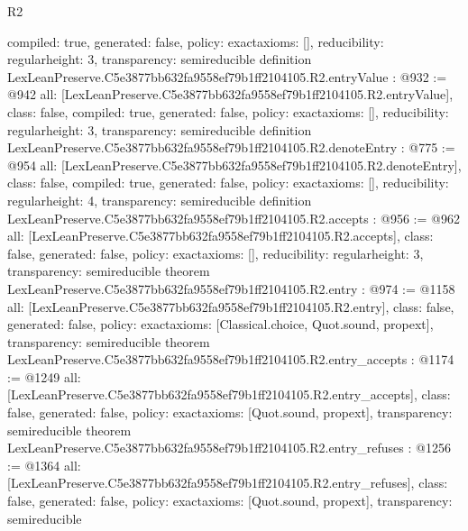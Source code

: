 \begin{lexlean}{R2}
\begin{coremodule}
{  compiled: true,
  generated: false,
  policy: exact{axioms: []},
  reducibility: regular{height: 3},
  transparency: semireducible
}
definition LexLeanPreserve.C5e3877bb632fa9558ef79b1ff2104105.R2.entryValue : @932 := @942 {
  all: [LexLeanPreserve.C5e3877bb632fa9558ef79b1ff2104105.R2.entryValue],
  class: false,
  compiled: true,
  generated: false,
  policy: exact{axioms: []},
  reducibility: regular{height: 3},
  transparency: semireducible
}
definition LexLeanPreserve.C5e3877bb632fa9558ef79b1ff2104105.R2.denoteEntry : @775 := @954 {
  all: [LexLeanPreserve.C5e3877bb632fa9558ef79b1ff2104105.R2.denoteEntry],
  class: false,
  compiled: true,
  generated: false,
  policy: exact{axioms: []},
  reducibility: regular{height: 4},
  transparency: semireducible
}
definition LexLeanPreserve.C5e3877bb632fa9558ef79b1ff2104105.R2.accepts : @956 := @962 {
  all: [LexLeanPreserve.C5e3877bb632fa9558ef79b1ff2104105.R2.accepts],
  class: false,
  generated: false,
  policy: exact{axioms: []},
  reducibility: regular{height: 3},
  transparency: semireducible
}
theorem LexLeanPreserve.C5e3877bb632fa9558ef79b1ff2104105.R2.entry : @974 := @1158 {
  all: [LexLeanPreserve.C5e3877bb632fa9558ef79b1ff2104105.R2.entry],
  class: false,
  generated: false,
  policy: exact{axioms: [Classical.choice, Quot.sound, propext]},
  transparency: semireducible
}
theorem LexLeanPreserve.C5e3877bb632fa9558ef79b1ff2104105.R2.entry_accepts : @1174 := @1249 {
  all: [LexLeanPreserve.C5e3877bb632fa9558ef79b1ff2104105.R2.entry_accepts],
  class: false,
  generated: false,
  policy: exact{axioms: [Quot.sound, propext]},
  transparency: semireducible
}
theorem LexLeanPreserve.C5e3877bb632fa9558ef79b1ff2104105.R2.entry_refuses : @1256 := @1364 {
  all: [LexLeanPreserve.C5e3877bb632fa9558ef79b1ff2104105.R2.entry_refuses],
  class: false,
  generated: false,
  policy: exact{axioms: [Quot.sound, propext]},
  transparency: semireducible
}


\end{coremodule}
\end{lexlean}
